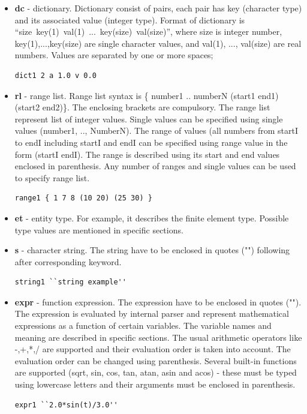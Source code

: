 \documentclass[a4paper]{article}
\begin{document}
\begin{itemize}
\item \textbf{dc} - dictionary. Dictionary consist of pairs, each pair has key
(character type) and its associated value (integer type).
Format of dictionary is
``size~key(1)~val(1)~...~key(size)~val(size)'', where size is integer
number, key(1),...,key(size) are single character values, and val(1),
..., val(size) are real numbers. Values are separated by one or more spaces;
\begin{lstlisting}[style=oofem, language=oofeminput, moreemph={dict1}]
dict1 2 a 1.0 v 0.0 
\end{lstlisting}
\item \textbf{rl} - range list. Range list syntax is \{ number1 .. numberN (start1
end1) (start2 end2)\}. The enclosing brackets are compulsory. The range
list represent list of integer values. Single values can be specified
using single values (number1, .., NumberN). The range of values
(all numbers from startI to endI including startI and endI can be
specified using range value in the form (startI endI). The range is
described using its start and end values enclosed in parenthesis.
Any number of ranges and single values can be used to specify range list.
\begin{lstlisting}[style=oofem, language=oofeminput, moreemph={range1}]
range1 { 1 7 8 (10 20) (25 30) }
\end{lstlisting}
\item \textbf{et} - entity type. For  example, it describes the finite element
type. Possible type values are mentioned in specific sections.
\item \textbf{s} - character string. The string have to be enclosed
in quotes ("") following after corresponding keyword.
\begin{lstlisting}[style=oofem, language=oofeminput, moreemph={string1}]
string1 ``string example''
\end{lstlisting}
\item \textbf{expr} - function expression. The expression have to be enclosed
in quotes (""). The expression is evaluated by internal parser and
represent mathematical expressions as a function of certain variables.
The variable names and meaning are described in specific sections.
The usual arithmetic operators like -,+,*,/ are supported and their
evaluation order is taken into account. The evaluation order can be
changed using parenthesis. Several built-in functions are supported
(sqrt, sin, cos, tan, atan, asin and acos) - these must be typed using
lowercase letters and their arguments must be enclosed in parenthesis.
\begin{lstlisting}[style=oofem, language=oofeminput, moreemph={expr1}]
expr1 ``2.0*sin(t)/3.0''
\end{lstlisting}

\end{itemize}
\end{document}
